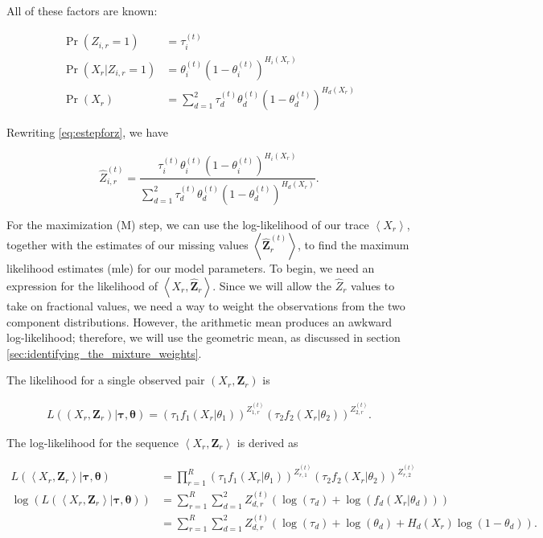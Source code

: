   All of these factors are known:

  \begin{align}
    \Pr(Z_{i, r} = 1) &= \tau_i^{(t)} \\
    \Pr(X_r | Z_{i, r} = 1) &= \theta_i^{(t)} (1 - \theta_i^{(t)})^{H_i(X_r)} \\
    \Pr(X_r) &=
        \sum_{d = 1}^{2}
        \tau_d^{(t)} \theta_d^{(t)} (1 - \theta_d^{(t)})^{H_d(X_r)}
  \end{align}

  Rewriting \ref{eq:estepforz}, we have

  \begin{equation}
  \label{eq:Z_estimate}
    \hat{Z}_{i, r}^{(t)} =
        \frac{\tau_i^{(t)} \theta_i^{(t)} (1 - \theta_i^{(t)})^{H_i(X_r)}}
        {\sum_{d = 1}^{2}
         \tau_d^{(t)} \theta_d^{(t)} (1 - \theta_d^{(t)})^{H_d(X_r)}} .
  \end{equation}

  For the maximization (M) step, we can use the log-likelihood of our trace
  $\left< X_r \right>$, together with the estimates of our missing values
  $\left< \hat{\bm{Z}}_r^{(t)} \right>$, to find the maximum likelihood
  estimates (mle) for our model parameters. To begin, we need an expression for
  the likelihood of $\left< X_r, \hat{\bm{Z}}_r \right>$. Since we will allow
  the $\hat{Z}_r$ values to take on fractional values, we need a way to weight the
  observations from the two component distributions. However, the arithmetic
  mean produces an awkward log-likelihood; therefore, we will use the geometric
  mean, as discussed in section \ref{sec:identifying_the_mixture_weights}.

  The likelihood for a single observed pair $(X_r, \bm{Z}_r)$ is

  \begin{align}
    L\left( (X_r, \bm{Z}_r ) | \bm{\tau}, \bm{\theta} \right) =
        (\tau_1 f_1(X_r | \theta_1))^{Z_{1, r}^{(t)}}
        (\tau_2 f_2(X_r | \theta_2))^{Z_{2, r}^{(t)}} .
  \end{align}

  The log-likelihood for the sequence $\left< X_r, \bm{Z}_r \right>$ is derived as

  \begin{align}
    L \left( \left< X_r, \bm{Z}_r \right> | \bm{\tau}, \bm{\theta} \right) &=
      \prod_{r = 1}^{R}
        (\tau_1 f_1(X_r | \theta_1))^{Z_{r, 1}^{(t)}}
        (\tau_2 f_2(X_r | \theta_2))^{Z_{r, 2}^{(t)}} \\
    \log \left( L \left( \left< X_r, \bm{Z}_r \right> | \bm{\tau}, \bm{\theta}
    \right)\right) &=
      \sum_{r=1}^{R} \sum_{d=1}^{2}
        Z_{d, r}^{(t)} (\log(\tau_d) + \log(f_d(X_r | \theta_d))) \\
    &=
      \sum_{r = 1}^{R} \sum_{d=1}^{2}
        Z_{d, r}^{(t)} (\log(\tau_d) + \log(\theta_d) + H_d(X_r) \log(1 -
        \theta_d)) .
  \end{align}

